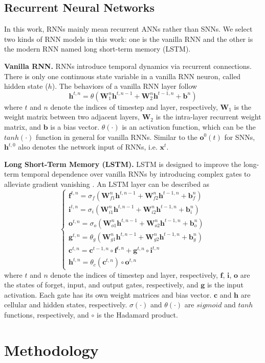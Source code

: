 \documentclass[journal,10pt,twocolumn]{IEEETran}
\begin{document}
\subsection{Recurrent Neural Networks}

In this work, RNNs mainly mean recurrent ANNs rather than SNNs. We select two kinds of RNN models in this work: one is the vanilla RNN and the other is the modern RNN named long short-term memory (LSTM).

\textbf{Vanilla RNN.} RNNs introduce temporal dynamics via recurrent connections. There is only one continuous state variable in a vanilla RNN neuron, called hidden state ($h$). The behaviors of a vanilla RNN layer follow
\begin{equation}
\label{equ:vanilla_RNN_layer}
\pmb{h}^{t,n}=\theta(\pmb{W}_1^{n}\pmb{h}^{t,n-1} + \pmb{W}_2^{n}\pmb{h}^{t-1,n} + \pmb{b}^{n})
\end{equation}
where $t$ and $n$ denote the indices of timestep and layer, respectively, $\pmb{W}_1$ is the weight matrix between two adjacent layers, $\pmb{W}_2$ is the intra-layer recurrent weight matrix, and $\pmb{b}$ is a bias vector. $\theta(\cdot)$ is an activation function, which can be the $tanh(\cdot)$ function in general for vanilla RNNs. Similar to the $\pmb{o}^{0}(t)$ for SNNs, $\pmb{h}^{t,0}$ also denotes the network input of RNNs, i.e. $\pmb{x}^t$.

\textbf{Long Short-Term Memory (LSTM).} LSTM is designed to improve the long-term temporal dependence over vanilla RNNs by introducing complex gates to alleviate gradient vanishing \cite{hochreiter1997long,gers1999learning}. An LSTM layer can be described as
\begin{equation}
\label{equ:LSTM_layer}
\begin{cases}
\pmb{f}^{t,n}=\sigma_f(\pmb{W}_{f1}^n\pmb{h}^{t,n-1}+\pmb{W}_{f2}^n\pmb{h}^{t-1,n} + \pmb{b}_f^n) \\
\pmb{i}^{t,n}=\sigma_i(\pmb{W}_{i1}^n\pmb{h}^{t,n-1}+\pmb{W}_{i2}^n\pmb{h}^{t-1,n} + \pmb{b}_i^n) \\
\pmb{o}^{t,n}=\sigma_o(\pmb{W}_{o1}^n\pmb{h}^{t,n-1}+\pmb{W}_{o2}^n\pmb{h}^{t-1,n} + \pmb{b}_o^n) \\
\pmb{g}^{t,n}=\theta_g(\pmb{W}_{g1}^n\pmb{h}^{t,n-1}+\pmb{W}_{g2}^n\pmb{h}^{t-1,n} + \pmb{b}_g^n) \\
\pmb{c}^{t,n}=\pmb{c}^{t-1,n}\circ \pmb{f}^{t,n}+\pmb{g}^{t,n}\circ \pmb{i}^{t,n} \\
\pmb{h}^{t,n}=\theta_c(\pmb{c}^{t,n})\circ \pmb{o}^{t,n}
\end{cases}
\end{equation}
where $t$ and $n$ denote the indices of timestep and layer, respectively, $\pmb{f}$, $\pmb{i}$, $\pmb{o}$ are the states of forget, input, and output gates, respectively, and $\pmb{g}$ is the input activation. Each gate has its own weight matrices and bias vector. $\pmb{c}$ and $\pmb{h}$ are cellular and hidden states, respectively. $\sigma(\cdot)$ and $\theta(\cdot)$ are $sigmoid$ and $tanh$ functions, respectively, and $\circ$ is the Hadamard product. \section{Methodology}\label{sec:methodology}
\end{document}
